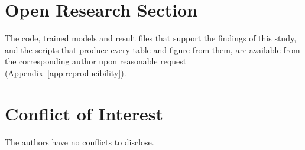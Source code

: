 \documentclass[draft]{PJ2019}
\begin{document}











\appendix







\section*{Open Research Section}
The code, trained models and result files that support the findings of this study, and the
scripts that produce every table and figure from them, are available from the corresponding
author upon reasonable request (Appendix~\ref{app:reproducibility}).

\section*{Conflict of Interest}
The authors have no conflicts to disclose.


\end{document}
